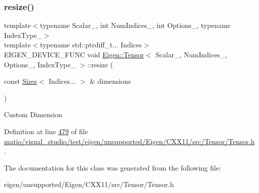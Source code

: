 \subsubsection{\texorpdfstring{resize()}{resize()}\hspace{0.1cm}{\footnotesize\ttfamily [4/4]}}
{\footnotesize\ttfamily template$<$typename Scalar\+\_\+, int Num\+Indices\+\_\+, int Options\+\_\+, typename Index\+Type\+\_\+$>$ \\
template$<$typename std\+::ptrdiff\+\_\+t... Indices$>$ \\
E\+I\+G\+E\+N\+\_\+\+D\+E\+V\+I\+C\+E\+\_\+\+F\+U\+NC void \hyperlink{class_eigen_1_1_tensor}{Eigen\+::\+Tensor}$<$ Scalar\+\_\+, Num\+Indices\+\_\+, Options\+\_\+, Index\+Type\+\_\+ $>$\+::resize (\begin{DoxyParamCaption}\item[{const \hyperlink{struct_eigen_1_1_sizes}{Sizes}$<$ Indices... $>$ \&}]{dimensions }\end{DoxyParamCaption})\hspace{0.3cm}{\ttfamily [inline]}}

Custom Dimension 

Definition at line \hyperlink{matio_2visual__studio_2test_2eigen_2unsupported_2_eigen_2_c_x_x11_2src_2_tensor_2_tensor_8h_source_l00479}{479} of file \hyperlink{matio_2visual__studio_2test_2eigen_2unsupported_2_eigen_2_c_x_x11_2src_2_tensor_2_tensor_8h_source}{matio/visual\+\_\+studio/test/eigen/unsupported/\+Eigen/\+C\+X\+X11/src/\+Tensor/\+Tensor.\+h}.



The documentation for this class was generated from the following file\+:\begin{DoxyCompactItemize}
\item 
eigen/unsupported/\+Eigen/\+C\+X\+X11/src/\+Tensor/\+Tensor.\+h\end{DoxyCompactItemize}
